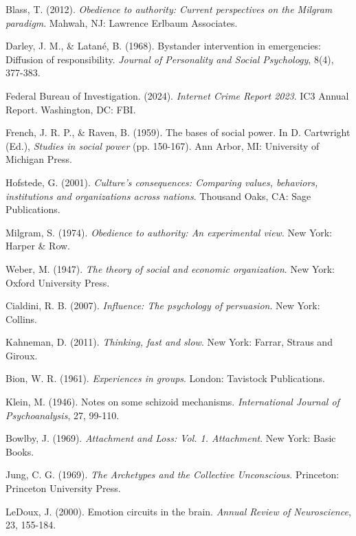 \documentclass[11pt,a4paper]{article}
\begin{document}
\begin{thebibliography}{99}

Blass, T. (2012). \textit{Obedience to authority: Current perspectives on the Milgram paradigm}. Mahwah, NJ: Lawrence Erlbaum Associates.

Darley, J. M., \& Latané, B. (1968). Bystander intervention in emergencies: Diffusion of responsibility. \textit{Journal of Personality and Social Psychology}, 8(4), 377-383.

Federal Bureau of Investigation. (2024). \textit{Internet Crime Report 2023}. IC3 Annual Report. Washington, DC: FBI.

French, J. R. P., \& Raven, B. (1959). The bases of social power. In D. Cartwright (Ed.), \textit{Studies in social power} (pp. 150-167). Ann Arbor, MI: University of Michigan Press.

Hofstede, G. (2001). \textit{Culture's consequences: Comparing values, behaviors, institutions and organizations across nations}. Thousand Oaks, CA: Sage Publications.

Milgram, S. (1974). \textit{Obedience to authority: An experimental view}. New York: Harper \& Row.

Weber, M. (1947). \textit{The theory of social and economic organization}. New York: Oxford University Press.

Cialdini, R. B. (2007). \textit{Influence: The psychology of persuasion}. New York: Collins.

Kahneman, D. (2011). \textit{Thinking, fast and slow}. New York: Farrar, Straus and Giroux.

Bion, W. R. (1961). \textit{Experiences in groups}. London: Tavistock Publications.

Klein, M. (1946). Notes on some schizoid mechanisms. \textit{International Journal of Psychoanalysis}, 27, 99-110.

Bowlby, J. (1969). \textit{Attachment and Loss: Vol. 1. Attachment}. New York: Basic Books.

Jung, C. G. (1969). \textit{The Archetypes and the Collective Unconscious}. Princeton: Princeton University Press.

LeDoux, J. (2000). Emotion circuits in the brain. \textit{Annual Review of Neuroscience}, 23, 155-184.


\end{thebibliography}
\end{document}
